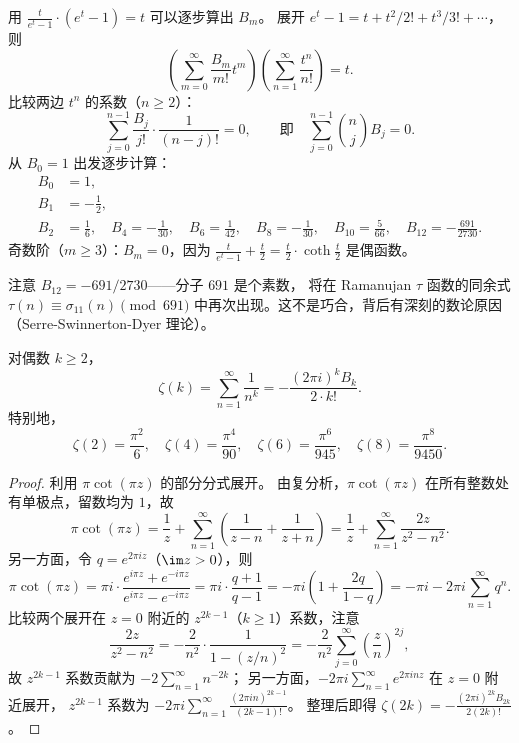 \begin{example}
\label{ex:bernoulli-numbers}
用 $\frac{t}{e^t - 1} \cdot (e^t - 1) = t$ 可以逐步算出 $B_m$。
展开 $e^t - 1 = t + t^2/2! + t^3/3! + \cdots$，则
\[
  \left(\sum_{m=0}^{\infty} \frac{B_m}{m!} t^m\right)
  \left(\sum_{n=1}^{\infty} \frac{t^n}{n!}\right) = t.
\]
比较两边 $t^n$ 的系数（$n \geq 2$）：
\[
  \sum_{j=0}^{n-1} \frac{B_j}{j!} \cdot \frac{1}{(n-j)!} = 0,
  \qquad \text{即} \quad
  \sum_{j=0}^{n-1} \binom{n}{j} B_j = 0.
\]
从 $B_0 = 1$ 出发逐步计算：
\begin{align*}
  B_0 &= 1, \\
  B_1 &= -\frac{1}{2}, \\
  B_2 &= \frac{1}{6}, \quad B_4 = -\frac{1}{30}, \quad
  B_6 = \frac{1}{42}, \quad B_8 = -\frac{1}{30}, \quad
  B_{10} = \frac{5}{66}, \quad B_{12} = -\frac{691}{2730}.
\end{align*}
奇数阶（$m \geq 3$）：$B_m = 0$，因为
$\frac{t}{e^t-1} + \frac{t}{2} = \frac{t}{2} \cdot \coth\frac{t}{2}$
是偶函数。
\end{example}

注意 $B_{12} = -691/2730$——分子 $691$ 是个素数，
将在 Ramanujan $\tau$ 函数的同余式 $\tau(n) \equiv \sigma_{11}(n) \pmod{691}$
中再次出现。这不是巧合，背后有深刻的数论原因（Serre-Swinnerton-Dyer 理论）。

\begin{proposition}
\label{prop:bernoulli-zeta}
对偶数 $k \geq 2$，
\[
  \zeta(k) = \sum_{n=1}^{\infty} \frac{1}{n^k}
  = -\frac{(2\pi i)^k B_k}{2 \cdot k!}.
\]
特别地，
\[
  \zeta(2) = \frac{\pi^2}{6}, \quad
  \zeta(4) = \frac{\pi^4}{90}, \quad
  \zeta(6) = \frac{\pi^6}{945}, \quad
  \zeta(8) = \frac{\pi^8}{9450}.
\]
\end{proposition}

\begin{proof}
利用 $\pi \cot(\pi z)$ 的部分分式展开。
由复分析，$\pi \cot(\pi z)$ 在所有整数处有单极点，留数均为 $1$，故
\[
  \pi \cot(\pi z) = \frac{1}{z} + \sum_{n=1}^{\infty}
  \left(\frac{1}{z-n} + \frac{1}{z+n}\right)
  = \frac{1}{z} + \sum_{n=1}^{\infty} \frac{2z}{z^2 - n^2}.
\]
另一方面，令 $q = e^{2\pi i z}$（$\im z > 0$），则
\[
  \pi\cot(\pi z)
  = \pi i \cdot \frac{e^{i\pi z} + e^{-i\pi z}}{e^{i\pi z} - e^{-i\pi z}}
  = \pi i \cdot \frac{q + 1}{q - 1}
  = -\pi i \left(1 + \frac{2q}{1-q}\right)
  = -\pi i - 2\pi i \sum_{n=1}^{\infty} q^n.
\]
比较两个展开在 $z = 0$ 附近的 $z^{2k-1}$（$k \geq 1$）系数，注意
\[
  \frac{2z}{z^2 - n^2} = -\frac{2}{n^2} \cdot \frac{1}{1 - (z/n)^2}
  = -\frac{2}{n^2} \sum_{j=0}^{\infty} \left(\frac{z}{n}\right)^{2j},
\]
故 $z^{2k-1}$ 系数贡献为 $-2\sum_{n=1}^\infty n^{-2k}$；
另一方面，$-2\pi i \sum_{n=1}^{\infty} e^{2\pi inz}$ 在 $z = 0$ 附近展开，
$z^{2k-1}$ 系数为 $-2\pi i \sum_{n=1}^\infty \frac{(2\pi i n)^{2k-1}}{(2k-1)!}$。
整理后即得 $\zeta(2k) = -\frac{(2\pi i)^{2k} B_{2k}}{2(2k)!}$。
\end{proof}

